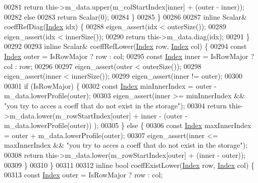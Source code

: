 \begin{DoxyCode}
00281                 \textcolor{keywordflow}{return} this->m\_data.upper(m\_colStartIndex[inner] + (outer - inner));
00282             \textcolor{keywordflow}{else}
00283                 \textcolor{keywordflow}{return} Scalar(0);
00284         \}
00285     \}
00286 
00287     \textcolor{keyword}{inline} Scalar& coeffRefDiag(\hyperlink{namespace_eigen_a62e77e0933482dafde8fe197d9a2cfde}{Index} idx) \{
00288         eigen\_assert(idx < outerSize());
00289         eigen\_assert(idx < innerSize());
00290         \textcolor{keywordflow}{return} this->m\_data.diag(idx);
00291     \}
00292 
00293     \textcolor{keyword}{inline} Scalar& coeffRefLower(\hyperlink{namespace_eigen_a62e77e0933482dafde8fe197d9a2cfde}{Index} row, \hyperlink{namespace_eigen_a62e77e0933482dafde8fe197d9a2cfde}{Index} col) \{
00294         \textcolor{keyword}{const} \hyperlink{namespace_eigen_a62e77e0933482dafde8fe197d9a2cfde}{Index} outer = IsRowMajor ? row : col;
00295         \textcolor{keyword}{const} \hyperlink{namespace_eigen_a62e77e0933482dafde8fe197d9a2cfde}{Index} inner = IsRowMajor ? col : row;
00296 
00297         eigen\_assert(outer < outerSize());
00298         eigen\_assert(inner < innerSize());
00299         eigen\_assert(inner != outer);
00300 
00301         \textcolor{keywordflow}{if} (IsRowMajor) \{
00302             \textcolor{keyword}{const} \hyperlink{namespace_eigen_a62e77e0933482dafde8fe197d9a2cfde}{Index} minInnerIndex = outer - m\_data.lowerProfile(outer);
00303             eigen\_assert(inner >= minInnerIndex && \textcolor{stringliteral}{"you try to acces a coeff that do not exist in the
       storage"});
00304             \textcolor{keywordflow}{return} this->m\_data.lower(m\_rowStartIndex[outer] + inner - (outer - m\_data.lowerProfile(outer))
      );
00305         \} \textcolor{keywordflow}{else} \{
00306             \textcolor{keyword}{const} \hyperlink{namespace_eigen_a62e77e0933482dafde8fe197d9a2cfde}{Index} maxInnerIndex = outer + m\_data.lowerProfile(outer);
00307             eigen\_assert(inner <= maxInnerIndex && \textcolor{stringliteral}{"you try to acces a coeff that do not exist in the
       storage"});
00308             \textcolor{keywordflow}{return} this->m\_data.lower(m\_rowStartIndex[outer] + (inner - outer));
00309         \}
00310     \}
00311 
00312     \textcolor{keyword}{inline} \textcolor{keywordtype}{bool} coeffExistLower(\hyperlink{namespace_eigen_a62e77e0933482dafde8fe197d9a2cfde}{Index} row, \hyperlink{namespace_eigen_a62e77e0933482dafde8fe197d9a2cfde}{Index} col) \{
00313         \textcolor{keyword}{const} \hyperlink{namespace_eigen_a62e77e0933482dafde8fe197d9a2cfde}{Index} outer = IsRowMajor ? row : col;

\end{DoxyCode}
